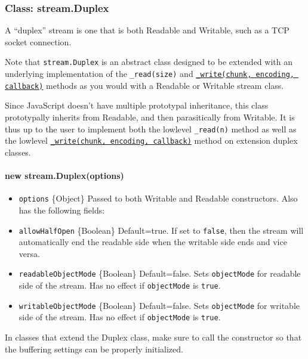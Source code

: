 \subsubsection{Class: stream.Duplex}\label{class-stream.duplex-1}

A ``duplex'' stream is one that is both Readable and Writable, such as a
TCP socket connection.

Note that \texttt{stream.Duplex} is an abstract class designed to be
extended with an underlying implementation of the \texttt{\_read(size)}
and
\hyperref[streamux5fwritableux5fwriteux5fchunkux5fencodingux5fcallbackux5f1]{\texttt{\_write(chunk, encoding, callback)}}
methods as you would with a Readable or Writable stream class.

Since JavaScript doesn't have multiple prototypal inheritance, this
class prototypally inherits from Readable, and then parasitically from
Writable. It is thus up to the user to implement both the lowlevel
\texttt{\_read(n)} method as well as the lowlevel
\hyperref[streamux5fwritableux5fwriteux5fchunkux5fencodingux5fcallbackux5f1]{\texttt{\_write(chunk, encoding, callback)}}
method on extension duplex classes.

\paragraph{new stream.Duplex(options)}\label{new-stream.duplexoptions}

\begin{itemize}
\itemsep1pt\parskip0pt
\item
  \texttt{options} \{Object\} Passed to both Writable and Readable
  constructors. Also has the following fields:
\item
  \texttt{allowHalfOpen} \{Boolean\} Default=true. If set to
  \texttt{false}, then the stream will automatically end the readable
  side when the writable side ends and vice versa.
\item
  \texttt{readableObjectMode} \{Boolean\} Default=false. Sets
  \texttt{objectMode} for readable side of the stream. Has no effect if
  \texttt{objectMode} is \texttt{true}.
\item
  \texttt{writableObjectMode} \{Boolean\} Default=false. Sets
  \texttt{objectMode} for writable side of the stream. Has no effect if
  \texttt{objectMode} is \texttt{true}.
\end{itemize}

In classes that extend the Duplex class, make sure to call the
constructor so that the buffering settings can be properly initialized.


